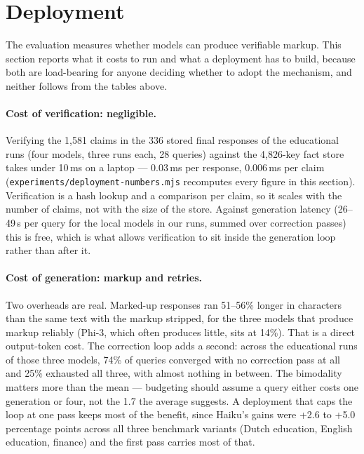 \documentclass[11pt,a4paper]{article}
\begin{document}
\section{Deployment}
\label{sec:deployment}

The evaluation measures whether models can produce verifiable markup. This section reports what it costs to run and what a deployment has to build, because both are load-bearing for anyone deciding whether to adopt the mechanism, and neither follows from the tables above.

\paragraph{Cost of verification: negligible.} Verifying the 1{,}581 claims in the 336 stored final responses of the educational runs (four models, three runs each, 28 queries) against the 4{,}826-key fact store takes under 10\,ms on a laptop --- 0.03\,ms per response, 0.006\,ms per claim (\texttt{experiments/deployment-numbers.mjs} recomputes every figure in this section). Verification is a hash lookup and a comparison per claim, so it scales with the number of claims, not with the size of the store. Against generation latency (26--49\,s per query for the local models in our runs, summed over correction passes) this is free, which is what allows verification to sit inside the generation loop rather than after it.

\paragraph{Cost of generation: markup and retries.} Two overheads are real. Marked-up responses ran 51--56\% longer in characters than the same text with the markup stripped, for the three models that produce markup reliably (Phi-3, which often produces little, sits at 14\%). That is a direct output-token cost. The correction loop adds a second: across the educational runs of those three models, 74\% of queries converged with no correction pass at all and 25\% exhausted all three, with almost nothing in between. The bimodality matters more than the mean --- budgeting should assume a query either costs one generation or four, not the 1.7 the average suggests. A deployment that caps the loop at one pass keeps most of the benefit, since Haiku's gains were +2.6 to +5.0 percentage points across all three benchmark variants (Dutch education, English education, finance) and the first pass carries most of that.
\end{document}
